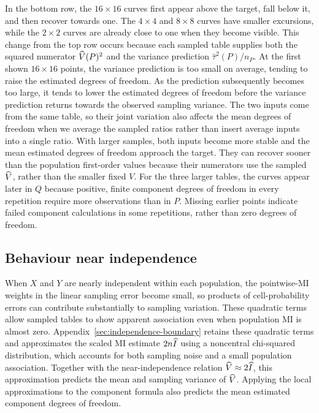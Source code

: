In the bottom row, the \(16\times16\) curves first appear above the target,
fall below it, and then recover towards one. The \(4\times4\) and
\(8\times8\) curves have smaller excursions, while the \(2\times2\)
curves are already close to one when they become visible. This change
from the top row occurs because each sampled table supplies both the
squared numerator \(\widehat V(P)^2\) and the variance prediction
\(\widehat\tau^2(P)/n_P\). At the first shown \(16\times16\) points, the variance prediction is
too small on average, tending to raise the estimated degrees of freedom.
As the prediction subsequently becomes too large, it tends to lower
the estimated degrees of freedom before the variance prediction returns
towards the observed sampling variance. The two inputs come from the same table, so their joint variation also
affects the mean degrees of freedom when we average the sampled ratios
rather than insert average inputs into a single ratio.
With larger samples, both inputs become more stable and the mean estimated
degrees of freedom approach the target. They can recover sooner than the
population first-order values because their numerators use the sampled
\(\widehat V\), rather than the smaller fixed \(V\). For the three larger
tables, the curves appear later in \(Q\) because positive, finite component
degrees of freedom in every repetition require more observations than in \(P\).
Missing earlier points indicate failed component calculations in some
repetitions, rather than zero degrees of freedom.

\FloatBarrier

\subsection{Behaviour near independence}

When \(X\) and \(Y\) are nearly independent within each population, the
pointwise-MI weights in the linear sampling error become small, so products
of cell-probability errors can contribute substantially to sampling variation. These quadratic terms allow sampled
tables to show apparent association even when population MI is almost
zero. Appendix~\ref{sec:independence-boundary} retains these quadratic terms
and approximates the scaled MI estimate \(2n\widehat I\) using a noncentral
chi-squared distribution, which accounts for both sampling noise and a
small population association. Together with the near-independence relation
\(\widehat V\approx2\widehat I\), this approximation predicts the mean and
sampling variance of \(\widehat V\). Applying the local approximations to the
component formula also predicts the mean estimated component degrees of
freedom.

